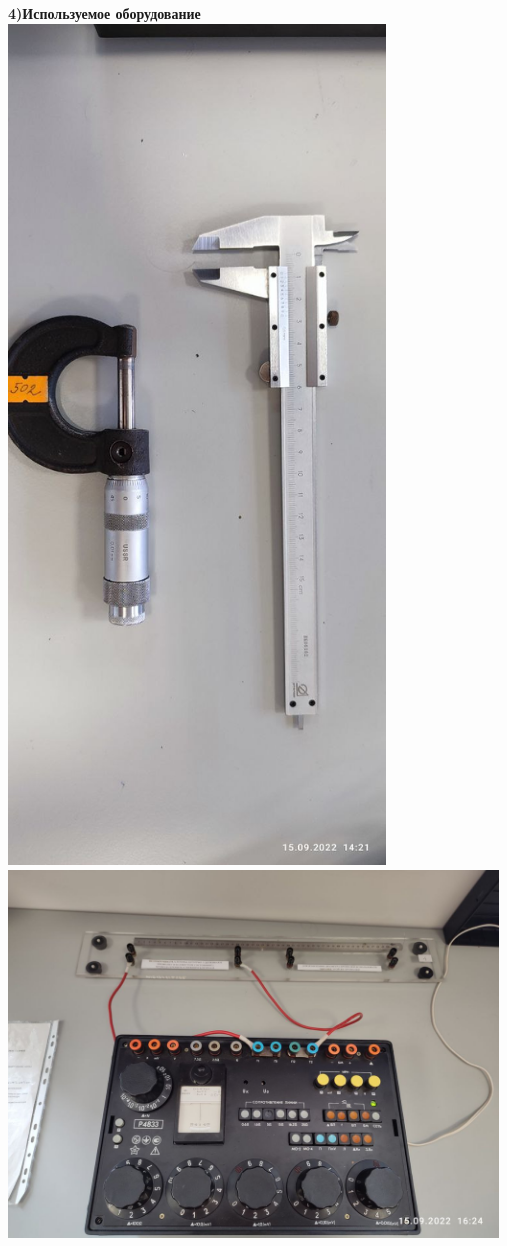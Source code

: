 \documentclass[a4paper, 12pt]{article}
\begin{document}
\vspace{2em}\textbf{4)Используемое оборудование}\\
\includegraphics[width=10cm]{A (2).jpg}\\
\includegraphics[width=13cm]{A (1).jpg}\\
\end{document}
